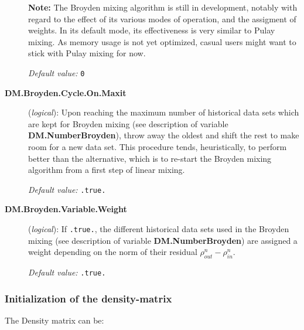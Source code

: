 \documentclass[11pt]{article}
\begin{document}
\begin{description}
{\bf Note:} The Broyden mixing algorithm is still in development,
notably with regard to the effect of its various modes of operation, and
the assigment of weights. In its default mode, its effectiveness is
very similar to Pulay mixing. As memory usage is not yet optimized,
casual users might want to stick with Pulay mixing for now.

{\it Default value:} {\tt 0}

\item[{\bf DM.Broyden.Cycle.On.Maxit}] ({\it logical}):
Upon reaching the maximum number of historical data sets which are
kept for Broyden mixing (see description of variable {\bf
  DM.NumberBroyden}), throw away the oldest and shift the rest to make
room for a new data set. This procedure tends, heuristically, to
perform better than the alternative, which is to re-start the Broyden
mixing algorithm from a first step of linear mixing.

{\it Default value:} {\tt .true.}

\item[{\bf DM.Broyden.Variable.Weight}] ({\it logical}):
If {\tt .true.}, the different historical data sets used in
the Broyden mixing (see description of variable {\bf
  DM.NumberBroyden}) are assigned a weight depending on the
norm of their residual ${\rho}^{n}_{out}-{\rho}^{n}_{in}$.

{\it Default value:} {\tt .true.}


\end{description}

\subsubsection{Initialization of the density-matrix}

The Density matrix can be:
\end{document}
